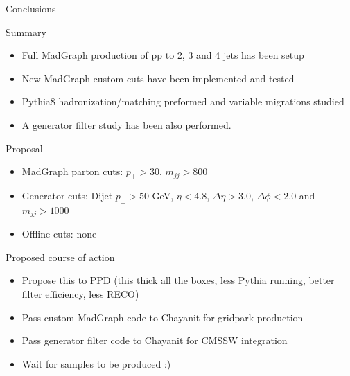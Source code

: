 \documentclass[8pt]{beamer}
\begin{document}
\begin{frame}{Conclusions}

\begin{block}{Summary}
  
\begin{itemize}
  \item Full MadGraph production of pp to 2, 3 and 4 jets has been setup
  \item New MadGraph custom cuts have been implemented and tested
  \item Pythia8 hadronization/matching preformed and variable migrations studied
  \item A generator filter study has been also performed. 
\end{itemize}

\end{block}

\begin{block}{Proposal}

\begin{itemize}
  \item MadGraph parton cuts: $p_\perp>30$, $m_{jj}>800$
  \item Generator cuts: Dijet $p_\perp>50$ GeV, $\eta<4.8$, $\Delta\eta>3.0$, $\Delta\phi<2.0$ and $m_{jj}>1000$
  \item Offline cuts: none
\end{itemize}
  
\end{block}

\begin{block}{Proposed course of action}

\begin{itemize}
  \item Propose this to PPD (this thick all the boxes, less Pythia running, better filter efficiency, less RECO)
  \item Pass custom MadGraph code to Chayanit for gridpark production
  \item Pass generator filter code to Chayanit for CMSSW integration
  \item Wait for samples to be produced :)
\end{itemize}
  
\end{block}


\end{frame}
\end{document}
